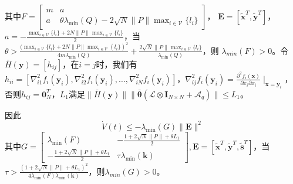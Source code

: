 \documentclass[12pt, a4paper, oneside]{ctexbook}
\begin{document}
其中$\left.F=\left[\begin{array}{cc}m&a\\
    a&\theta\lambda_{\min}(Q)-2\sqrt{N}\|P\|\max_{i\in\mathcal{V}}\{l_i\}\end{array}\right.\right]$，
    $\mathbf{E} = [\tilde{\mathbf{x}}^T,\tilde{\mathbf{y}}^T]$，
    ~~~~~$a = -\frac{\max_{i\in\mathcal{V}}\{l_{i}\}+2N\|P\|\max_{i\in\mathcal{V}}\{l_{i}\}}{2}$，当
    $\theta > \frac{(\max_{i\in\mathcal{V}}\{l_{i}\}+2N\|P\|\max_{i\in\mathcal{V}}(l_{i}\})^{2}}{4m\lambda_{\mathrm{min}}(Q)}+\frac{2\sqrt{N}\|P\|\max_{i\in\mathcal{V}}\{l_{i}\}}{\lambda_{\mathrm{min}}(Q)}$，则
    $\lambda_{min}(F) > 0$。令$\bar{H}(\mathbf{y})=[h_{ij}]$，在$i = j$时，我们有$h_{ii}=[\nabla_{i1}^{2}f_{i}(\mathbf{y}_{i}),\nabla_{i2}^{2}f_{i}(\mathbf{y}_{i}),\ldots,\nabla_{iN}^{2}f_{i}(\mathbf{y}_{i})]$，$\nabla_{ij}^{2}f_{i}(\mathbf{y}_{i})=\frac{\partial^{2}f_{i}(\mathbf{x})}{\partial x_{i}\partial x_{i}}\mid_{\mathbf{x}=\mathbf{y}_{i}}$，否则$h_{ij} = \mathbf{0}_N^T$，$L_1$满足$\|\bar{H}(\mathbf{y})\|\|\bar{\boldsymbol{\theta}}(\mathcal{L}\otimes \mathbf{I}_{N\times N}+\mathcal{A}_{q})\|\leq L_{1}$。

因此
$$
\dot{V}(t) \leq -\lambda_{\min}(G)\|\mathbf{E}\|^2
$$
其中$\left.G=\left[\begin{array}{cc}\lambda_{\min}(F)&-\frac{1+2\sqrt{N}\|P\|+\theta L_1}2\\-\frac{1+2\sqrt{N}\|P\|+\theta L_1}2&\tau\lambda_{\min}(\mathbf{k})\end{array}\right.\right], 
\mathbf{E} = [\tilde{\mathbf{x}}^T,\tilde{\mathbf{y}}^T,\tilde{\mathbf{s}}^T]$，当
$\tau>\frac{(1+2\sqrt{N}\|P\|+\theta L_{1})^{2}}{4\lambda_{\mathrm{min}}(F)\lambda_{\mathrm{min}}(\mathbf{k})}$，则$\lambda_{min}(G) > 0$。
\end{document}
